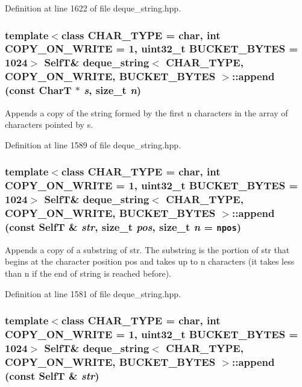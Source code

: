 Definition at line 1622 of file deque\_\-string.hpp.\hypertarget{classdeque__string_b3efd86d189fba40ab8587cbfb9b22a0}{
\subsubsection[{append}]{\setlength{\rightskip}{0pt plus 5cm}template$<$class CHAR\_\-TYPE  = char, int COPY\_\-ON\_\-WRITE = 1, uint32\_\-t BUCKET\_\-BYTES = 1024$>$ {\bf SelfT}\& {\bf deque\_\-string}$<$ CHAR\_\-TYPE, COPY\_\-ON\_\-WRITE, BUCKET\_\-BYTES $>$::append (const CharT $\ast$ {\em s}, \/  size\_\-t {\em n})}}
\label{classdeque__string_b3efd86d189fba40ab8587cbfb9b22a0}


Appends a copy of the string formed by the first n characters in the array of characters pointed by s. 

Definition at line 1589 of file deque\_\-string.hpp.\hypertarget{classdeque__string_126a9388b25ceecb1c4ad3bc4ac4b087}{
\subsubsection[{append}]{\setlength{\rightskip}{0pt plus 5cm}template$<$class CHAR\_\-TYPE  = char, int COPY\_\-ON\_\-WRITE = 1, uint32\_\-t BUCKET\_\-BYTES = 1024$>$ {\bf SelfT}\& {\bf deque\_\-string}$<$ CHAR\_\-TYPE, COPY\_\-ON\_\-WRITE, BUCKET\_\-BYTES $>$::append (const {\bf SelfT} \& {\em str}, \/  size\_\-t {\em pos}, \/  size\_\-t {\em n} = {\tt {\bf npos}})}}
\label{classdeque__string_126a9388b25ceecb1c4ad3bc4ac4b087}


Appends a copy of a substring of str. The substring is the portion of str that begins at the character position pos and takes up to n characters (it takes less than n if the end of string is reached before). 

Definition at line 1581 of file deque\_\-string.hpp.\hypertarget{classdeque__string_5e906ef1d178767fdf3c0058f5eeed55}{
\subsubsection[{append}]{\setlength{\rightskip}{0pt plus 5cm}template$<$class CHAR\_\-TYPE  = char, int COPY\_\-ON\_\-WRITE = 1, uint32\_\-t BUCKET\_\-BYTES = 1024$>$ {\bf SelfT}\& {\bf deque\_\-string}$<$ CHAR\_\-TYPE, COPY\_\-ON\_\-WRITE, BUCKET\_\-BYTES $>$::append (const {\bf SelfT} \& {\em str})}}
\label{classdeque__string_5e906ef1d178767fdf3c0058f5eeed55}


